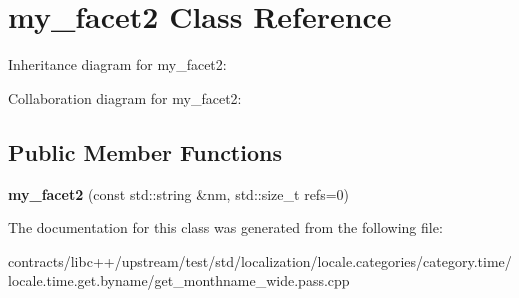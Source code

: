 \hypertarget{classmy__facet2}{}\section{my\+\_\+facet2 Class Reference}
\label{classmy__facet2}


Inheritance diagram for my\+\_\+facet2\+:


Collaboration diagram for my\+\_\+facet2\+:
\subsection*{Public Member Functions}
\begin{DoxyCompactItemize}
\item 
\mbox{\label{classmy__facet2_a704676a8b02c4ea3600124bb47abc05e}} 
{\bfseries my\+\_\+facet2} (const std\+::string \&nm, std\+::size\+\_\+t refs=0)
\end{DoxyCompactItemize}


The documentation for this class was generated from the following file\+:\begin{DoxyCompactItemize}
\item 
contracts/libc++/upstream/test/std/localization/locale.\+categories/category.\+time/locale.\+time.\+get.\+byname/get\+\_\+monthname\+\_\+wide.\+pass.\+cpp\end{DoxyCompactItemize}
